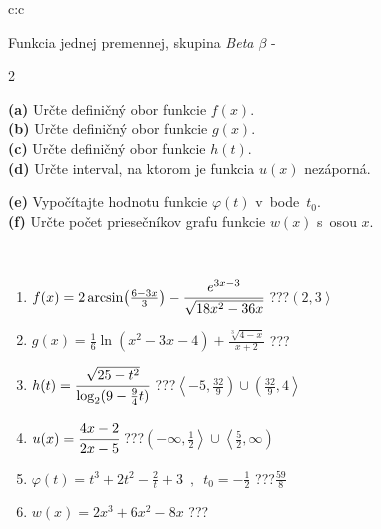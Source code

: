 \documentclass[10pt]{report}
\begin{document}
\begin{tabular}{c:c}
\begin{minipage}[c][104.5mm][t]{0.5\linewidth}
\begin{center}
\vspace{7mm}
{\huge Funkcia jednej premennej, skupina \textit{Beta $\beta$} -}\\[5mm]
\begin{minipage}{0.95\linewidth}
\begin{center}
{\small \begin{multicols}{2} \raggedright
\textbf{(a)} Určte definičný obor funkcie \(f(x)\). \\[1mm]
\textbf{(b)} Určte definičný obor funkcie \(g(x)\). \\[1mm]
\textbf{(c)} Určte definičný obor funkcie \(h(t)\). \\[1mm]
\textbf{(d)} Určte interval, na ktorom je funkcia \(u(x)\) nezáporná. \par \columnbreak
\textbf{(e)} Vypočítajte hodnotu funkcie \(\varphi(t)\) v~bode~\(t_0\). \\[1mm]
\textbf{(f)} Určte počet priesečníkov grafu funkcie \(w(x)\) s~osou \(x\). \\[1mm]
\end{multicols}
}
\end{center}
\end{minipage}
\\[4mm]
\begin{minipage}{0.79\linewidth}
\begin{center}
\begin{varwidth}{\linewidth}
\begin{enumerate}
\small
\item $f(x) = 2\arcsin\!\left( \frac{6-3x}{3} \right) - \cfrac{e^{3x-3}}{\sqrt{18x^2-36x}}$\quad \dotfill\; ???\;\dotfill \quad $\left(2 , 3\right\rangle$
\item $g(x) = \frac{1}{6} \ln{\!(x^2-3x-4)}+\frac{\sqrt[3]{4-x}}{x+2}$\quad \dotfill\; ???\;\dotfill {}
\item $h(t) = \cfrac{\sqrt{25-t^2}}{\log_2(9-\frac{9}{4}t)}$\quad \dotfill\; ???\;\dotfill \quad $\left\langle-5 , \frac{32}{9}\right)\cup\left(\frac{32}{9} , 4\right\rangle$
\item $u(x) = \cfrac{4x-2}{2x-5}$\quad \dotfill\; ???\;\dotfill \quad $\left(-\infty , \frac{1}{2}\right\rangle\cup\left\langle\frac{5}{2} , \infty\right)$
\item $\varphi(t) = t^3+2t^2-\frac{2}{t}+3 \enspace , \enspace t_0=-\frac{1}{2}$\quad \dotfill\; ???\;\dotfill \quad $\frac{59}{8}$
\item $w(x) = 2x^3+6x^2-8x$\quad \dotfill\; ???\;\dotfill {}

\end{enumerate}
\end{varwidth}
\end{center}
\end{minipage}
\end{center}
\end{minipage}
\end{tabular}
\end{document}
